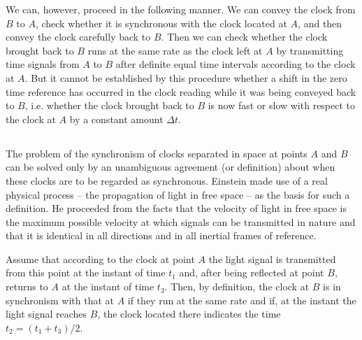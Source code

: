 We can, however, proceed in the following manner. We can convey the clock from $B$ to $A$, check whether it is synchronous with the clock located at $A$, and then convey the clock carefully back to $B$. Then we can check whether the clock brought back to $B$ runs at the same rate as the clock left at $A$ by transmitting time signals from $A$ to $B$ after definite equal time intervals according to the clock at $A$. But it cannot be established by this procedure whether a shift in the zero time reference has occurred in the clock reading while it was being conveyed back to $B$, i.e. whether the clock brought back to $B$ is now fast or slow with respect to the clock at $A$ by a constant amount $\Delta t$. 

\subsection{}\label{5.2.3} The problem of the synchronism of clocks separated in space at points $A$ and $B$ can be solved only by an unambiguous agreement (or definition) about when these clocks are to be regarded as synchronous. Einstein made use of a real physical process -- the propagation of light in free space -- as the basis for such a definition. He proceeded from the facts that the velocity of light in free space is the maximum possible velocity at which signals can be transmitted in nature and that it is identical in all directions and in all inertial frames of ref­erence.

Assume that according to the clock at point $A$ the light signal is transmitted from this point at the instant of time $t_{1}$ and, after being reflected at point $B$, returns to $A$ at the instant of time $t_{3}$. Then, by definition, the clock at $B$ is in synchronism with that at $A$ if they run at the same rate and if, at the instant the light signal reaches $B$, the clock located there indicates the time $t_{2}= (t_{1}+ t_{3})/2$.

